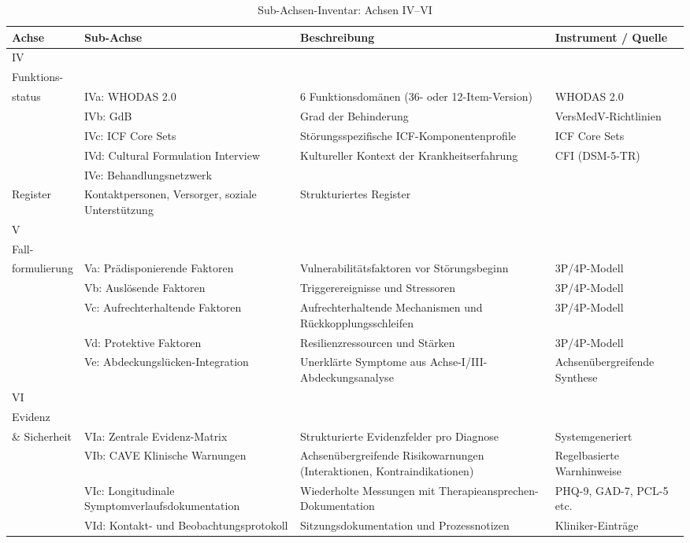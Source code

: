 \documentclass[11pt,a4paper]{article}
\newenvironment{CompactLongTable}{%
  \begingroup
  \footnotesize
  \setstretch{1.0}%
  \setlength{\LTpre}{0pt}%
  \setlength{\LTpost}{0pt}%
}{%
  \endgroup
}
\begin{document}
\begin{table}[H]
\centering
\caption{Sub-Achsen-Inventar: Achsen IV--VI}
\label{tab:subaxes_part3}
\begin{CompactLongTable}
\begin{tabular}{@{}L{1.8cm}L{2.4cm}L{5.0cm}L{4.0cm}@{}}
\toprule
\textbf{Achse} & \textbf{Sub-Achse} & \textbf{Beschreibung} & \textbf{Instrument / Quelle} \\
\midrule
IV\\Funktions-\\status & IVa: WHODAS 2.0 & 6 Funktionsdom\"anen (36- oder 12-Item-Version) & WHODAS 2.0 \\
 & IVb: GdB & Grad der Behinderung & VersMedV-Richtlinien \\
 & IVc: ICF Core Sets & St\"orungsspezifische ICF-Komponentenprofile & ICF Core Sets \\
 & IVd: Cultural Formulation Interview & Kultureller Kontext der Krankheitserfahrung & CFI (DSM-5-TR) \\
 & IVe: Behandlungsnetzwerk\\Register & Kontaktpersonen, Versorger, soziale Unterst\"utzung & Strukturiertes Register \\
\midrule
V\\Fall-\\formulierung & Va: Pr\"adisponierende Faktoren & Vulnerabilit\"atsfaktoren vor St\"orungsbeginn & 3P/4P-Modell \\
 & Vb: Ausl\"osende Faktoren & Triggerereignisse und Stressoren & 3P/4P-Modell \\
 & Vc: Aufrechterhaltende Faktoren & Aufrechterhaltende Mechanismen und R\"uckkopplungsschleifen & 3P/4P-Modell \\
 & Vd: Protektive Faktoren & Resilienzressourcen und St\"arken & 3P/4P-Modell \\
 & Ve: Abdeckungsl\"ucken-Integration & Unerkl\"arte Symptome aus Achse-I/III-Abdeckungsanalyse & Achsen\"ubergreifende Synthese \\
\midrule
VI\\Evidenz\\\& Sicherheit & VIa: Zentrale Evidenz-Matrix & Strukturierte Evidenzfelder pro Diagnose & Systemgeneriert \\
 & VIb: CAVE Klinische Warnungen & Achsen\"ubergreifende Risikowarnungen (Interaktionen, Kontraindikationen) & Regelbasierte Warnhinweise \\
 & VIc: Longitudinale Symptomverlaufsdokumentation & Wiederholte Messungen mit Therapieansprechen-Dokumentation & PHQ-9, GAD-7, PCL-5 etc. \\
 & VId: Kontakt- und Beobachtungsprotokoll & Sitzungsdokumentation und Prozessnotizen & Kliniker-Eintr\"age \\
\bottomrule
\end{tabular}
\end{CompactLongTable}
\end{table}
\end{document}
